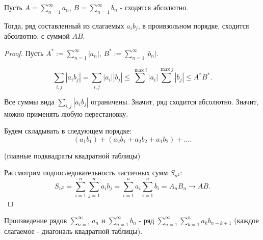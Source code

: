 \begin{theorem} \thmslashn

    Пусть $A = \sum\limits_{n=1}^{\infty} a_{n}$, $B = \sum\limits_{n=1}^{\infty} b_{n}$ - сходятся абсолютно.

    Тогда, ряд составленный из слагаемых $a_{i}b_{j}$, в проивзольном порядке, сходится абсолютно, с суммой $AB$.
    \begin{proof} \thmslashn
    
        Пусть $A^{*} := \sum\limits_{n=1}^{\infty} |a_{n}|$, $B^{*} := \sum\limits_{n=1}^{\infty} |b_{n}|$.

    \[ \sum\limits_{i,j} |a_{i}b_{j}| = \sum\limits_{i,j} |a_{i}| |b_{j}| \le \sum^{\max i} |a_{i}| \sum^{\max j} |b_{j}| \le A^{*}B^{*}.\]

    Все суммы вида $\sum\limits_{i, j} |a_{i}b_{j}|$ ограничены. Значит, ряд сходится абсолютно. Значит, можно применять любую перестановку.

    Будем складывать в следующем порядке: 
    \[ (a_{1}b_{1}) + (a_2b_1 + a_2b_2 + a_1b_2) + \ldots.\]

    (главные подквадраты квадратной таблицы)

    Рассмотрим подпоследовательность частичных сумм $S_{n^2}$:
    \[ S_{n^2} = \sum\limits_{i=1}^{n}\sum\limits_{j=1}^{n} a_{i}b_{j} = \sum\limits_{i=1}^{n} a_{i} \sum\limits_{i=1}^{n} b_{i} = A_{n}B_{n} \to AB .\] 
    \end{proof}
\end{theorem}
\begin{definition} \thmslashn 

    Произведение рядов $\sum\limits_{n=1}^{\infty} a_{n}$ и $\sum\limits_{n=1}^{\infty} b_{n}$ - ряд $\sum\limits_{n=1}^{\infty} \sum\limits_{k=1}^{n} a_{k}b_{n-k+1}$ (каждое слагаемое - диагональ квадратной таблицы).
\end{definition}


